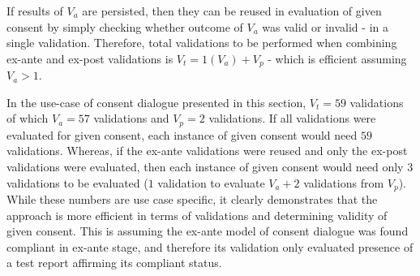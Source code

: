If results of $V_{a}$ are persisted, then they can be reused in evaluation of given consent by simply checking whether outcome of $V_{a}$ was valid or invalid - in a single validation. Therefore, total validations to be performed when combining ex-ante and ex-post validations is $V_{t} = 1(V_{a}) + V_{p}$ - which is efficient assuming $V_{a} > 1$.

In the use-case of consent dialogue presented in this section, $V_{t}=59$ validations of which $V_{a}=57$ validations and $V_{p}=2$ validations. If all validations were evaluated for given consent, each instance of given consent would need $59$ validations. Whereas, if the ex-ante validations were reused and only the ex-post validations were evaluated, then each instance of given consent would need only $3$ validations to be evaluated ($1$ validation to evaluate $V_{a} + 2$ validations from $V_{p}$). While these numbers are use case specific, it clearly demonstrates that the approach is more efficient in terms of validations and determining validity of given consent. This is assuming the ex-ante model of consent dialogue was found compliant in ex-ante stage, and therefore its validation only evaluated presence of a test report affirming its compliant status.

